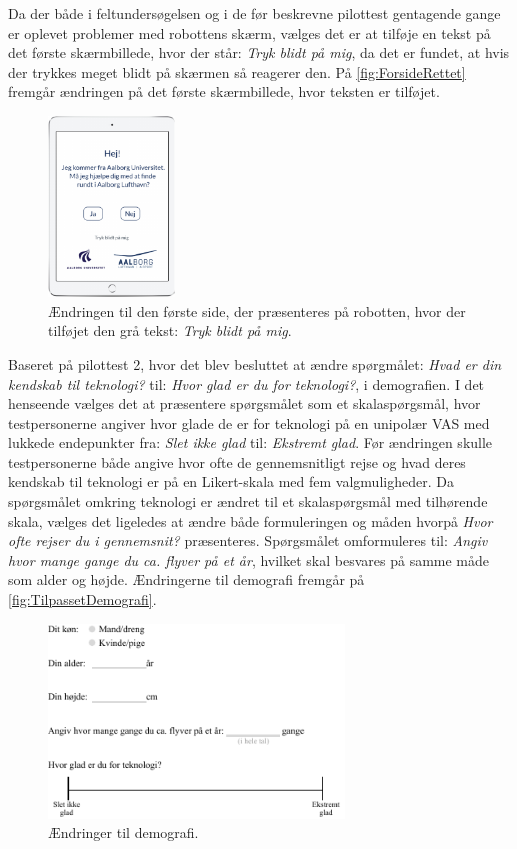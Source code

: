 Da der både i feltundersøgelsen og i de før beskrevne pilottest gentagende gange er oplevet problemer med robottens skærm, vælges det er at tilføje en tekst på det første skærmbillede, hvor der står: \textit{Tryk blidt på mig}, da det er fundet, at hvis der trykkes meget blidt på skærmen så reagerer den. På \autoref{fig:ForsideRettet} fremgår ændringen på det første skærmbillede, hvor teksten er tilføjet.    
%
\begin{figure}[H]
\centering
\includegraphics[width = 0.3\textwidth]{Figure/TestdesignEvaluering/ForsideRettet} 
\caption{Ændringen til den første side, der præsenteres på robotten, hvor der tilføjet den grå tekst: \textit{Tryk blidt på mig}.}
\label{fig:ForsideRettet}
\end{figure}
\noindent
%
Baseret på pilottest 2, hvor det blev besluttet at ændre spørgmålet: \textit{Hvad er din kendskab til teknologi?} til: \textit{Hvor glad er du for teknologi?}, i demografien. I det henseende vælges det at præsentere spørgsmålet som et skalaspørgsmål, hvor testpersonerne angiver hvor glade de er for teknologi på en unipolær VAS med lukkede endepunkter fra: \textit{Slet ikke glad} til: \textit{Ekstremt glad}. Før ændringen skulle testpersonerne både angive hvor ofte de gennemsnitligt rejse og hvad deres kendskab til teknologi er på en Likert-skala med fem valgmuligheder. Da spørgsmålet omkring teknologi er ændret til et skalaspørgsmål med tilhørende skala, vælges det ligeledes at ændre både formuleringen og måden hvorpå \textit{Hvor ofte rejser du i gennemsnit?} præsenteres. Spørgsmålet omformuleres til: \textit{Angiv hvor mange gange du ca. flyver på et år}, hvilket skal besvares på samme måde som alder og højde. Ændringerne til demografi fremgår på \autoref{fig:TilpassetDemografi}.
\newpage
%
\begin{figure}[H]
\centering
\includegraphics[width = 0.7\textwidth]{Figure/TestdesignEvaluering/TilpassetDemografi} 
\caption{Ændringer til demografi.}
\label{fig:TilpassetDemografi}
\end{figure}
